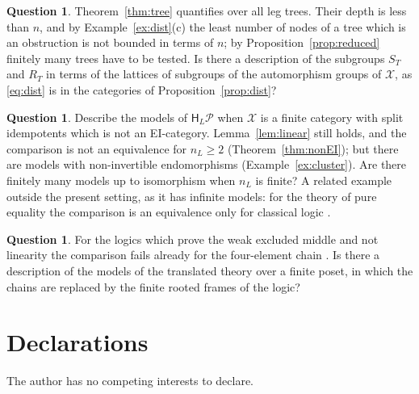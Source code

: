 \documentclass[11pt]{amsart}
\theoremstyle{definition}
\newtheorem{que}[thm]{Question}
\newcommand{\HH}{\mathsf H}
\newcommand{\cX}{\mathcal X}
\newcommand{\cP}{\mathcal P}
\begin{document}
\begin{que}
Theorem~\ref{thm:tree} quantifies over all leg trees. Their depth is
less than $n$, and by Example~\ref{ex:dist}(c) the least number of
nodes of a tree which is an obstruction is not bounded in terms of
$n$; by Proposition~\ref{prop:reduced} finitely many trees have to be
tested. Is there a description of the subgroups $S_T$ and $R_T$ in terms of the
lattices of subgroups of the automorphism groups of $\cX$, as
\eqref{eq:dist} is in the categories of
Proposition~\ref{prop:dist}?
\end{que}

\begin{que}
Describe the models of $\HH_L\cP$ when $\cX$ is a finite category
with split idempotents which is not an EI-category.
Lemma~\ref{lem:linear} still holds, and the comparison is not an
equivalence for $n_L\ge2$ (Theorem~\ref{thm:nonEI}); but there are
models with non-invertible endomorphisms
(Example~\ref{ex:cluster}). Are there finitely many models up to
isomorphism when $n_L$ is finite? A related example outside the present
setting, as it has infinite models: for the theory of pure equality
the comparison is an equivalence only for classical logic
\cite{Interm}.
\end{que}

\begin{que}
For the logics which prove the weak excluded middle and not linearity
the comparison fails already for the four-element chain \cite{Interm}.
Is there a description of the models of the translated theory over a
finite poset, in which the chains are replaced by the finite rooted
frames of the logic?
\end{que}

\section*{Declarations}
The author has no competing interests to declare.
\end{document}
